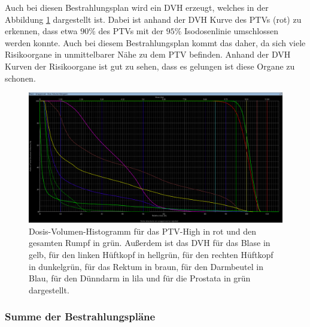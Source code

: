 Auch bei diesen Bestrahlungsplan wird ein DVH erzeugt, welches in der Abbildung \ref{abb:DVH2}
dargestellt ist. Dabei ist anhand der DVH Kurve des PTVs (rot) zu erkennen, dass etwa $90\%$ des
PTVs mit der $95\%$ Isodosenlinie umschlossen werden konnte. Auch bei diesem
Bestrahlungsplan kommt das daher, da sich viele Risikoorgane in unmittelbarer Nähe zu dem
PTV befinden. Anhand der DVH Kurven der Risikoorgane ist gut zu sehen, dass es gelungen ist diese
Organe zu schonen.

\begin{figure}[H]
  \centering
  \includegraphics[width=\textwidth]{Bilder/Prostata2_DVH.png}
  \caption{Dosis-Volumen-Histogramm für das PTV-High in rot und den gesamten Rumpf in grün. Außerdem ist das DVH für das Blase in gelb, für den linken Hüftkopf in hellgrün, für den rechten Hüftkopf in dunkelgrün, für das Rektum in braun, für den Darmbeutel in Blau, für den Dünndarm in lila und für die Prostata in grün dargestellt.}
  \label{abb:DVH2}
\end{figure}


\subsubsection*{Summe der Bestrahlungspläne}

